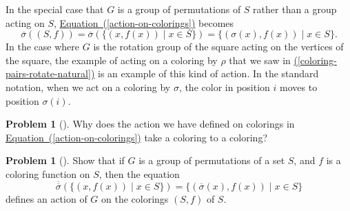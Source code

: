 \documentclass[10pt,]{book}
\theoremstyle{plain}
\theoremstyle{definition}
\newtheorem{activity}[project]{Problem}
\theoremstyle{definition}
\numberwithin{equation}{chapter}
\begin{document}
\par
In the special case that \(G\) is a group of permutations of \(S\) rather than a group acting on \(S\), \hyperref[action-on-colorings]{Equation~(\ref{action-on-colorings})} becomes%
\begin{equation*}
\overline{\sigma}((S,f)) = \overline{\sigma}(\{(x,f(x))\mid x\in S\}) = \{(\sigma(x),f(x))\mid x\in S\}\text{.}
\end{equation*}
In the case where \(G\) is the rotation group of the square acting on the vertices of the square, the example of acting on a coloring by \(\rho\) that we saw in \hyperref[coloring-pairs-rotate-natural]{(\ref{coloring-pairs-rotate-natural})} is an example of this kind of action. In the standard notation, when we act on a coloring by \(\sigma\), the color in position \(i\) moves to position \(\sigma(i)\).%
\begin{activity}[]\marginsymbol[-1em]{} \label{coloring-to-coloring}
Why does the action we have defined on colorings in \hyperref[action-on-colorings]{Equation~(\ref{action-on-colorings})} take a coloring to a coloring?%
\end{activity}
\begin{activity}[]\marginsymbol[-1em]{} \label{activity-286}
Show that if \(G\) is a group of permutations of a set \(S\), and \(f\) is a coloring function on \(S\), then the equation%
\begin{equation*}
\overline{\overline{\sigma}}(\{(x,f(x))\mid x\in S\}) = \{(\overline{\sigma}(x),f(x))\mid x\in S\}
\end{equation*}
defines an action of \(G\) on the colorings \((S,f)\) of \(S\).%
\end{activity}
\typeout{************************************************}
\typeout{************************************************}
\end{document}
